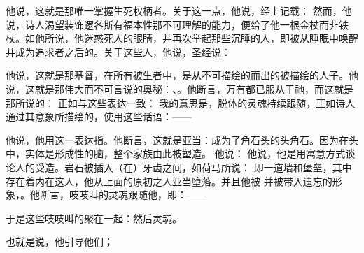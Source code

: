 \par

他说，这就是那唯一掌握生死权柄者。关于这一点，他说，经上记载： 然而，他说，诗人渴望装饰逻各斯有福本性那不可理解的能力，便给了他一根金杖而非铁杖。如他所说，他迷惑死人的眼睛，并再次举起那些沉睡的人，即被从睡眠中唤醒并成为追求者之后的。关于这些人，他说，圣经说： \par

他说，这就是那基督，在所有被生者中，是从不可描绘的而出的被描绘的人子。他说，这就是那伟大而不可言说的奥秘：、。他断言，万有都已服从于祂，而这就是那所说的：  正如与这些表达一致： 我的意思是，脱体的灵魂持续跟随，正如诗人通过其意象所描绘的，使用这些话语：——\par

\par

\par

他说，他用这一表达指。他断言，这就是亚当：成为了角石头的头角石。因为在头中，实体是形成性的脑，整个家族由此被塑造。 他说： 他说，他是用寓意方式谈论人的受造。岩石被插入（在）牙齿之间，如荷马所说： 即一道墙和堡垒，其中存在着内在这人，他从上面的原初之人亚当堕落。并且他被 并被带入遗忘的形象，。他断言，吱吱叫的灵魂跟随他，即：——\par

于是这些吱吱叫的聚在一起：然后灵魂。\par

也就是说，他引导他们；\par

\par

